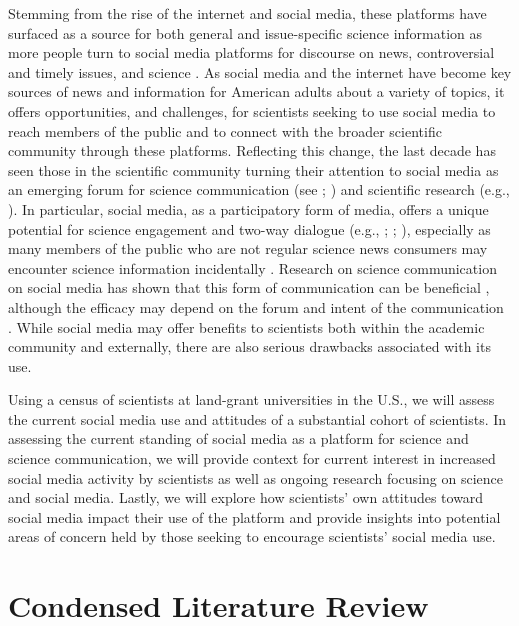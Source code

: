 \documentclass[12pt,]{article}
\begin{document}
Stemming from the rise of the internet and social media, these platforms have surfaced as a source for both general and issue-specific science information as more people turn to social media platforms for discourse on news, controversial and timely issues, and science \autocite{nsb2018science}. As social media and the internet have become key sources of news and information for American adults about a variety of topics, it offers opportunities, and challenges, for scientists seeking to use social media to reach members of the public and to connect with the broader scientific community through these platforms. Reflecting this change, the last decade has seen those in the scientific community turning their attention to social media as an emerging forum for science communication (see \textcite{brossard2013science}; \textcite{peters2014public}) and scientific research (e.g., \textcite{yeo2017case}). In particular, social media, as a participatory form of media, offers a unique potential for science engagement and two-way dialogue (e.g., \textcite{jia2017encountered}; \textcite{peters2014public}; \textcite{smith2015wow}), especially as many members of the public who are not regular science news consumers may encounter science information incidentally \autocites{fletcher2018people}{funk2017science}. Research on science communication on social media has shown that this form of communication can be beneficial \autocite{junger2020does}, although the efficacy may depend on the forum and intent of the communication \autocite{jia2017encountered}. While social media may offer benefits to scientists both within the academic community and externally, there are also serious drawbacks associated with its use.

Using a census of scientists at land-grant universities in the U.S., we will assess the current social media use and attitudes of a substantial cohort of scientists. In assessing the current standing of social media as a platform for science and science communication, we will provide context for current interest in increased social media activity by scientists as well as ongoing research focusing on science and social media. Lastly, we will explore how scientists' own attitudes toward social media impact their use of the platform and provide insights into potential areas of concern held by those seeking to encourage scientists' social media use.

\hypertarget{condensed-literature-review}{%
\section{Condensed Literature Review}\label{condensed-literature-review}}
\end{document}
